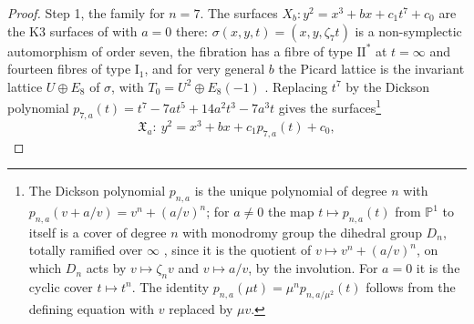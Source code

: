 \documentclass[11pt,reqno]{amsart}
\numberwithin{equation}{section}
\theoremstyle{plain}
\theoremstyle{definition}
\begin{document}
\begin{proof}
Step 1, the family for $n=7$. The surfaces $X_{b}\colon y^{2}=x^{3}+bx+c_{1}t^{7}+c_{0}$ are the K3 surfaces of \cite[Ex.~6.1]{AST11} with $a=0$ there: $\sigma(x,y,t)=(x,y,\zeta_{7}t)$ is a non-symplectic automorphism of order seven, the fibration has a fibre of type $\mathrm{II}^{*}$ at $t=\infty$ and fourteen fibres of type $\mathrm{I}_{1}$, and for very general $b$ the Picard lattice is the invariant lattice $U\oplus E_{8}$ of $\sigma$, with $T_{0}=U^{2}\oplus E_{8}(-1)$ \cite[Table~3]{AST11}. Replacing $t^{7}$ by the Dickson polynomial $p_{7,a}(t)=t^{7}-7at^{5}+14a^{2}t^{3}-7a^{3}t$ gives the surfaces\footnote{The Dickson polynomial $p_{n,a}$ is the unique polynomial of degree $n$ with $p_{n,a}(v+a/v)=v^{n}+(a/v)^{n}$; for $a\ne0$ the map $t\mapsto p_{n,a}(t)$ from $\mathbb{P}^{1}$ to itself is a cover of degree $n$ with monodromy group the dihedral group $D_{n}$, totally ramified over $\infty$ \cite[Lem.~4.3]{vGS25}, since it is the quotient of $v\mapsto v^{n}+(a/v)^{n}$, on which $D_{n}$ acts by $v\mapsto\zeta_{n}v$ and $v\mapsto a/v$, by the involution. For $a=0$ it is the cyclic cover $t\mapsto t^{n}$. The identity $p_{n,a}(\mu t)=\mu^{n}p_{n,a/\mu^{2}}(t)$ follows from the defining equation with $v$ replaced by $\mu v$.}
\begin{equation}\label{eq:dickson7}
\mathfrak{X}_{a}\colon\ y^{2}=x^{3}+bx+c_{1}p_{7,a}(t)+c_{0},
\end{equation}

\end{proof}
\end{document}
